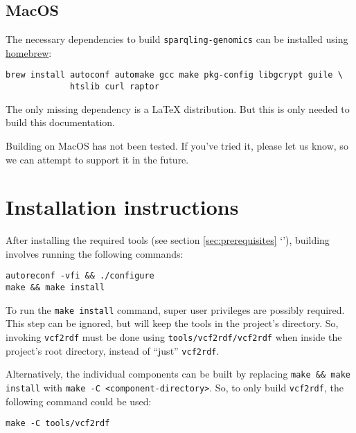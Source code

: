 \subsection{MacOS}

  The necessary dependencies to build \texttt{sparqling-genomics} can be
  installed using \href{https://brew.sh/}{homebrew}:

\begin{siderules}
\begin{verbatim}
brew install autoconf automake gcc make pkg-config libgcrypt guile \
             htslib curl raptor
\end{verbatim}
\end{siderules}

  The only missing dependency is a \LaTeX{} distribution.  But this is
  only needed to build this documentation.

  Building on MacOS has not been tested.  If you've tried it, please let
  us know, so we can attempt to support it in the future.

\section{Installation instructions}

  After installing the required tools (see section \ref{sec:prerequisites}
  {\color{LinkGray}`\nameref{sec:prerequisites}'}),
  building involves running the following commands:

\begin{siderules}
\begin{verbatim}
autoreconf -vfi && ./configure
make && make install
\end{verbatim}
\end{siderules}

  To run the \texttt{make install} command, super user privileges are possibly
  required.  This step can be ignored, but will keep the tools in the project's
  directory.  So, invoking \texttt{vcf2rdf} must be done using
  \texttt{tools/vcf2rdf/vcf2rdf} when inside the project's root directory,
  instead of ``just'' \texttt{vcf2rdf}.

Alternatively, the individual components can be built by replacing
\texttt{make \&\& make install} with \texttt{make -C <component-directory>}.
So, to only build \texttt{vcf2rdf}, the following command could be used:
\begin{siderules}
\begin{verbatim}
make -C tools/vcf2rdf
\end{verbatim}
\end{siderules}

